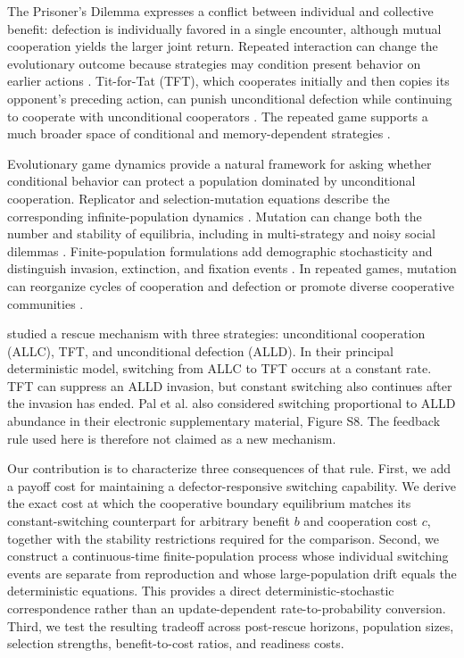 \documentclass[pdflatex,sn-mathphys-ay]{sn-jnl}
\theoremstyle{thmstyleone}
\begin{document}
The Prisoner's Dilemma expresses a conflict between individual and collective benefit: defection is individually favored in a single encounter, although mutual cooperation yields the larger joint return. Repeated interaction can change the evolutionary outcome because strategies may condition present behavior on earlier actions \citep{axelrod1981,axelrod1984,nowak2006}. Tit-for-Tat (TFT), which cooperates initially and then copies its opponent's preceding action, can punish unconditional defection while continuing to cooperate with unconditional cooperators \citep{nowak1992}. The repeated game supports a much broader space of conditional and memory-dependent strategies \citep{stewart2013}.

Evolutionary game dynamics provide a natural framework for asking whether conditional behavior can protect a population dominated by unconditional cooperation. Replicator and selection-mutation equations describe the corresponding infinite-population dynamics \citep{taylor1978,hofbauer1998,hofbauer1985,hadeler1981,page2002}. Mutation can change both the number and stability of equilibria, including in multi-strategy and noisy social dilemmas \citep{antal2009,chen2024}. Finite-population formulations add demographic stochasticity and distinguish invasion, extinction, and fixation events \citep{moran1962,nowak2004,traulsen2006,fudenberg2006}. In repeated games, mutation can reorganize cycles of cooperation and defection or promote diverse cooperative communities \citep{imhof2005,imhof2007,tkadlec2023}.

\citet{pal2025} studied a rescue mechanism with three strategies: unconditional cooperation (ALLC), TFT, and unconditional defection (ALLD). In their principal deterministic model, switching from ALLC to TFT occurs at a constant rate. TFT can suppress an ALLD invasion, but constant switching also continues after the invasion has ended. Pal et al. also considered switching proportional to ALLD abundance in their electronic supplementary material, Figure S8. The feedback rule used here is therefore not claimed as a new mechanism.

Our contribution is to characterize three consequences of that rule. First, we add a payoff cost for maintaining a defector-responsive switching capability. We derive the exact cost at which the cooperative boundary equilibrium matches its constant-switching counterpart for arbitrary benefit $b$ and cooperation cost $c$, together with the stability restrictions required for the comparison. Second, we construct a continuous-time finite-population process whose individual switching events are separate from reproduction and whose large-population drift equals the deterministic equations. This provides a direct deterministic-stochastic correspondence rather than an update-dependent rate-to-probability conversion. Third, we test the resulting tradeoff across post-rescue horizons, population sizes, selection strengths, benefit-to-cost ratios, and readiness costs.
\end{document}
